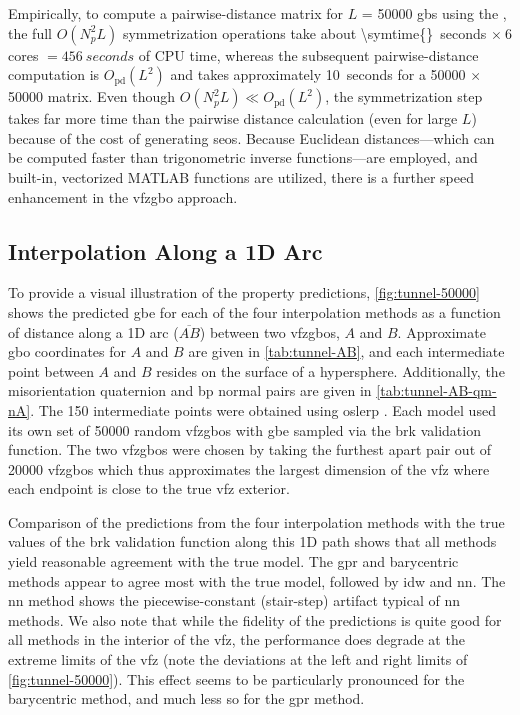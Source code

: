 \documentclass[final,twocolumn,12pt]{elsarticle}
\begin{document}
Empirically, to compute a pairwise-distance matrix for $L$ = \num{50000} \glspl{gb} using the \vfzorepo{} \cite{bairdFiveDegreeofFreedom5DOF2020}, the full $O(N_p^2L)$ symmetrization operations take about \SI{\symtime{}}{seconds} $\times\ 6$ cores $= \SI{456}{seconds}$ of CPU time, whereas the subsequent pairwise-distance computation is $O_{\text{pd}}(L^2)$ and takes approximately \SI{10}{seconds} for a \num{50000} $\times$ \num{50000} matrix. Even though $O(N_p^2L) \ll O_{\text{pd}}(L^2)$, the symmetrization step takes far more time than the pairwise distance calculation (even for large $L$) because of the cost of generating \glspl{seo}. Because Euclidean distances---which can be computed faster than trigonometric inverse functions---are employed, and built-in, vectorized MATLAB functions are utilized, there is a further speed enhancement in the \gls{vfzgbo} approach. %
%
\subsection{Interpolation Along a 1D Arc} \label{sec:results:vis:arc}
%
To provide a visual illustration of the property predictions, \cref{fig:tunnel-50000} shows the predicted \gls{gbe} for each of the four interpolation methods as a function of distance along a 1D arc ($\overline{AB}$) between two \glspl{vfzgbo}, $A$ and $B$. Approximate \gls{gbo} coordinates for $A$ and $B$ are given in \cref{tab:tunnel-AB}, and each intermediate point between $A$ and $B$ resides on the surface of a hypersphere. Additionally, the misorientation quaternion and \gls{bp} normal pairs are given in \cref{tab:tunnel-AB-qm-nA}. The \num{150} intermediate points were obtained using \gls{oslerp} \cite{francisGeodesicOctonionMetric2019}. Each model used its own set of \num{50000} random \inpt{} \glspl{vfzgbo} with \gls{gbe} sampled via the \gls{brk} validation function. The two \glspl{vfzgbo} were chosen by taking the furthest apart pair out of \num{20000} \glspl{vfzgbo} which thus approximates the largest dimension of the \gls{vfz} where each endpoint is close to the true \gls{vfz} exterior.

Comparison of the predictions from the four interpolation methods with the true values of the \gls{brk} validation function along this 1D path shows that all methods yield reasonable agreement with the true model. The \gls{gpr} and barycentric methods appear to agree most with the true model, followed by \gls{idw} and \gls{nn}. The \gls{nn} method shows the piecewise-constant (stair-step) artifact typical of \gls{nn} methods. We also note that while the fidelity of the predictions is quite good for all methods in the interior of the \gls{vfz}, the performance does degrade at the extreme limits of the \gls{vfz} (note the deviations at the left and right limits of \cref{fig:tunnel-50000}). This effect seems to be particularly pronounced for the barycentric method, and much less so for the \gls{gpr} method.
\end{document}
